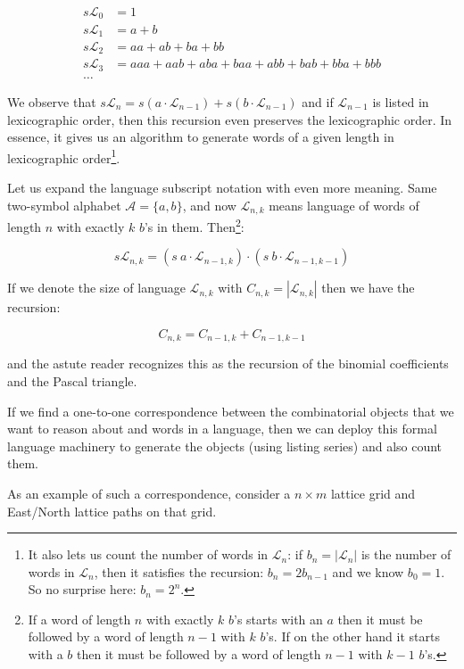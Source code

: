 \begin{align*}
s \mathcal{L}_0 &= 1 \\
s \mathcal{L}_1 &= a + b \\
s \mathcal{L}_2 &= aa + ab + ba + bb \\
s \mathcal{L}_3 &= aaa + aab + aba + baa + abb + bab + bba + bbb \\
\ldots
\end{align*}

We observe that $s \mathcal{L}_n = s (a \cdot \mathcal{L}_{n-1}) + s (b \cdot \mathcal{L}_{n-1})$ and if $\mathcal{L}_{n-1}$ is listed in lexicographic order, then this recursion even preserves the lexicographic order. In essence, it gives us an algorithm to generate words of a given length in lexicographic order\footnote{It also lets us count the number of words in $\mathcal{L}_n$: if $b_n = |\mathcal{L}_n|$ is the number of words in $\mathcal{L}_n$, then it satisfies the recursion: $b_n = 2 b_{n-1}$ and we know $b_0 = 1$. So no surprise here: $b_n = 2^n$.}.

Let us expand the language subscript notation with even more meaning. Same two-symbol alphabet $\mathcal{A} = \{a, b\}$, and now $\mathcal{L}_{n,k}$ means language of words of length $n$ with exactly $k$ $b$'s in them. Then\footnote{If a word of length $n$ with exactly $k$ $b$'s starts with an $a$ then it must be followed by a word of length $n-1$ with $k$ $b$'s. If on the other hand it starts with a $b$ then it must be followed by a word of length $n-1$ with $k-1$ $b$'s.}:

$$
s \mathcal{L}_{n, k} = (s \ a \cdot \mathcal{L}_{n-1, k}) \cdot (s \ b \cdot \mathcal{L}_{n-1, k-1})
$$

If we denote the size of language $\mathcal{L}_{n, k}$ with $C_{n, k} = |\mathcal{L}_{n, k}|$ then we have the recursion:

$$
C_{n, k} = C_{n-1, k} + C_{n-1, k-1}
$$

and the astute reader recognizes this as the recursion of the binomial coefficients and the Pascal triangle.

If we find a one-to-one correspondence between the combinatorial objects that we want to reason about and words in a language, then we can deploy this formal language machinery to generate the objects (using listing series) and also count them.

As an example of such a correspondence, consider a $n \times m$ lattice grid and East/North lattice paths on that grid.


